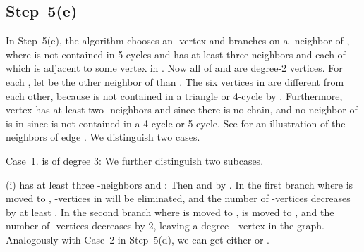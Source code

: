 \documentclass{elsart_TR2}
\begin{document}
\subsection{Step~5(e)}

In Step~5(e), the algorithm chooses
an  -vertex  and branches on a -neighbor   of ,
where   is not contained in 5-cycles and  has at least three neighbors  and 
each of which is adjacent  to some vertex in .
Now all of  and  are degree-2 vertices.
For each , let  be the other neighbor of  than .
The six vertices in  are different from each other,
because  is not contained in a triangle or 4-cycle by .
Furthermore, vertex  has at least two -neighbors  and  since there is no chain, and
no neighbor of  is in  since  is not contained in a 4-cycle or 5-cycle.
See  for an illustration of the neighbors of edge .
We distinguish two cases.

\vspace{-0mm}\vspace{-0mm}

Case~1.  is of degree 3: We further distinguish two subcases.

(i)   has at least three -neighbors  and :
Then
  and  by .
In the  first branch where  is moved to , -vertices in  will be eliminated,
 and the number of -vertices
decreases by at least .
In the second branch where  is moved to ,   is moved to ,  and the number of -vertices
decreases by 2, leaving a degree- -vertex  in the graph.
Analogously with Case~2 in Step~5(d), we can get either  or .
\end{document}
